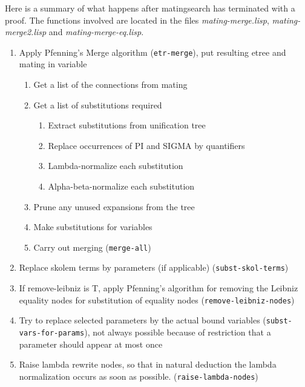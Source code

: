 Here is a summary of what happens after matingsearch has terminated with
a proof. 
The functions involved are located in the files {\it mating-merge.lisp},
{\it mating-merge2.lisp} and {\it mating-merge-eq.lisp}.

\begin{enumerate}
\item Apply Pfenning's Merge algorithm ({\tt etr-merge}), put resulting
      etree and mating in variable 
  \begin{enumerate}
\item  Get a list of the connections from mating

\item Get a list of substitutions required
      \begin{enumerate}
\item  Extract substitutions from unification tree
        
\item  Replace occurrences of PI and SIGMA by quantifiers
        
\item  Lambda-normalize each substitution
        
\item  Alpha-beta-normalize each substitution
      \end{enumerate}
    
\item  Prune any unused expansions from the tree
    
\item  Make substitutions for variables
    
\item  Carry out merging ({\tt merge-all})
  \end{enumerate}

\item  Replace skolem terms by parameters (if applicable) 
({\tt subst-skol-terms})

\item  If remove-leibniz is T, apply Pfenning's algorithm for removing
      the Leibniz equality nodes for substitution of equality nodes
      ({\tt remove-leibniz-nodes})

\item  Try to replace selected parameters by the actual bound variables
      ({\tt subst-vars-for-params}), not always possible because of restriction
      that a parameter should appear at most once

\item  Raise lambda rewrite nodes, so that in natural deduction the lambda
      normalization occurs as soon as possible. ({\tt raise-lambda-nodes})


\end{enumerate}
